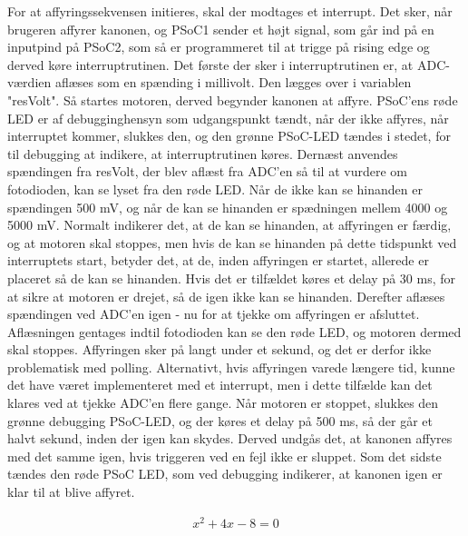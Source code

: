 For at affyringssekvensen initieres, skal der modtages et interrupt. Det sker, når brugeren affyrer kanonen, og PSoC1 sender et højt signal, som går ind på en inputpind på PSoC2, som så er programmeret til at trigge på rising edge og derved køre interruptrutinen.
Det første der sker i interruptrutinen er, at ADC-værdien aflæses som en spænding i millivolt. Den lægges over i variablen "resVolt". Så startes motoren, derved begynder kanonen at affyre. PSoC'ens røde LED er af debugginghensyn som udgangspunkt tændt, når der ikke affyres, når interruptet kommer, slukkes den, og den grønne PSoC-LED tændes i stedet, for til debugging at indikere, at interruptrutinen køres.
Dernæst anvendes spændingen fra resVolt, der blev aflæst fra ADC'en så til at vurdere om fotodioden, kan se lyset fra den røde LED. Når de ikke kan se hinanden er spændingen 500 mV, og når de kan se hinanden er spædningen mellem 4000 og 5000 mV. Normalt indikerer det, at de kan se hinanden, at affyringen er færdig, og at motoren skal stoppes, men hvis de kan se hinanden på dette tidspunkt ved interruptets start, betyder det, at de, inden affyringen er startet, allerede er placeret så de kan se hinanden. Hvis det er tilfældet køres et delay på 30 ms, for at sikre at motoren er drejet, så de igen ikke kan se hinanden. Derefter aflæses spændingen ved ADC'en igen - nu for at tjekke om affyringen er afsluttet. Aflæsningen gentages indtil fotodioden kan se den røde LED, og motoren dermed skal stoppes. Affyringen sker på langt under et sekund, og det er derfor ikke problematisk med polling. Alternativt, hvis affyringen varede længere tid, kunne det have været implementeret med et interrupt, men i dette tilfælde kan det klares ved at tjekke ADC'en flere gange.
Når motoren er stoppet, slukkes den grønne debugging PSoC-LED, og der køres et delay på 500 ms, så der går et halvt sekund, inden der igen kan skydes. Derved undgås det, at kanonen affyres med det samme igen, hvis triggeren ved en fejl ikke er sluppet. Som det sidste tændes den røde PSoC LED, som ved debugging indikerer, at kanonen igen er klar til at blive affyret.



\begin{align}
	x^2 + 4x - 8 = 0 \label{eq:yndlingsligning}
\end{align}



